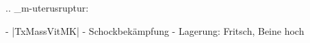 
.. _m-uterusruptur:


\begin{itemize}
	-   |TxMassVitMK|
	-   Schockbekämpfung
	-   Lagerung: Fritsch, Beine hoch
\end{itemize}